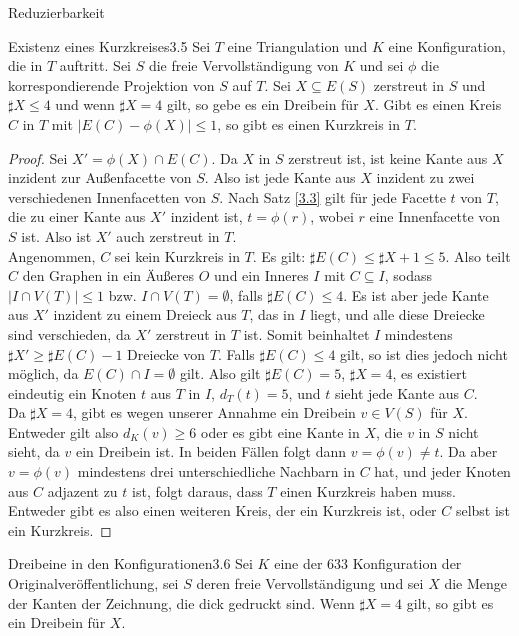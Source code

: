 \begin{section}{Reduzierbarkeit}
 \begin{satzl}{Existenz eines Kurzkreises}{3.5}
  Sei $T$ eine Triangulation und $K$ eine Konfiguration, die in $T$ auftritt. Sei $S$ die freie Vervollständigung von $K$ und sei $\phi$ die korrespondierende Projektion von $S$ auf $T$. Sei $X \subseteq E(S)$ zerstreut in $S$ und $\sharp X \leq 4$ und wenn $\sharp X = 4$ gilt, so gebe es ein Dreibein für $X$. Gibt es einen Kreis $C$ in $T$ mit $|E(C) - \phi(X)| \leq 1$, so gibt es einen Kurzkreis in $T$.
 \end{satzl}
 \begin{proof}
  Sei $X' = \phi(X) \cap E(C)$. Da $X$ in $S$ zerstreut ist, ist keine Kante aus $X$ inzident zur Außenfacette von $S$. Also ist jede Kante aus $X$ inzident zu zwei verschiedenen Innenfacetten von $S$. Nach Satz \ref{3.3} gilt für jede Facette $t$ von $T$, die zu einer Kante aus $X'$ inzident ist, $t=\phi(r)$, wobei $r$ eine Innenfacette von $S$ ist. Also ist $X'$ auch zerstreut in $T$.\\
  Angenommen, $C$ sei kein Kurzkreis in $T$. Es gilt: $\sharp E(C) \leq \sharp X +1 \leq 5$. Also teilt $C$ den Graphen in ein Äußeres $O$ und ein Inneres $I$ mit $C \subseteq I$, sodass $|I \cap V(T)| \leq 1$ bzw. $I \cap V(T) = \emptyset$, falls $\sharp E(C) \leq 4$. Es ist aber jede Kante aus $X'$ inzident zu einem Dreieck aus $T$, das in $I$ liegt, und alle diese Dreiecke sind verschieden, da $X'$ zerstreut in $T$ ist. Somit beinhaltet $I$ mindestens $\sharp X' \geq \sharp E(C) -1$ Dreiecke von $T$. Falls $\sharp E(C) \leq 4$ gilt, so ist dies jedoch nicht möglich, da $E(C) \cap I = \emptyset$ gilt. Also gilt $\sharp E(C) = 5$, $\sharp X = 4$, es existiert eindeutig ein Knoten $t$ aus $T$ in $I$, $d_T(t) = 5$, und $t$ sieht jede Kante aus $C$.\\
  Da $\sharp X = 4$, gibt es wegen unserer Annahme ein Dreibein $v\in V(S)$ für $X$. Entweder gilt also $d_K(v) \geq 6$ oder es gibt eine Kante in $X$, die $v$ in $S$ nicht sieht, da $v$ ein Dreibein ist. In beiden Fällen folgt dann $v=\phi(v)\neq t$. Da aber $v=\phi(v)$ mindestens drei unterschiedliche Nachbarn in $C$ hat, und jeder Knoten aus $C$ adjazent zu $t$ ist, folgt daraus, dass $T$ einen Kurzkreis haben muss. \\
  Entweder gibt es also einen weiteren Kreis, der ein Kurzkreis ist, oder $C$ selbst ist ein Kurzkreis.
 \end{proof}
 
 \begin{satzl}{Dreibeine in den Konfigurationen}{3.6}
  Sei $K$ eine der 633 Konfiguration der Originalveröffentlichung, sei $S$ deren freie Vervollständigung und sei $X$ die Menge der Kanten der Zeichnung, die dick gedruckt sind. Wenn $\sharp X = 4$ gilt, so gibt es ein Dreibein für $X$.
 \end{satzl}
 

\end{section}
